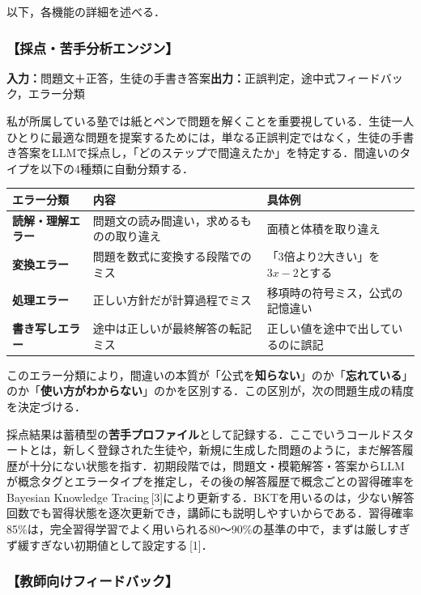 \documentclass[paper=a4,fontsize=10.5bp,jafontsize=10.5bp,twocolumn]{jlreq}
\begin{document}
以下，各機能の詳細を述べる．

\subsubsection{【採点・苦手分析エンジン】}

\noindent\textbf{入力：}問題文＋正答，生徒の手書き答案\quad\textbf{出力：}正誤判定，途中式フィードバック，エラー分類

私が所属している塾では紙とペンで問題を解くことを重要視している．生徒一人ひとりに最適な問題を提案するためには，単なる正誤判定ではなく，生徒の手書き答案をLLMで採点し，「どのステップで間違えたか」を特定する．間違いのタイプを以下の4種類に自動分類する．

\begin{scriptsize}\noindent
\begin{tabularx}{\linewidth}{>{\bfseries}l X X}
\toprule
エラー分類 & 内容 & 具体例 \\
\midrule
読解・理解エラー & 問題文の読み間違い，求めるものの取り違え & 面積と体積を取り違え \\
変換エラー & 問題を数式に変換する段階でのミス & 「3倍より2大きい」を$3x-2$とする \\
処理エラー & 正しい方針だが計算過程でミス & 移項時の符号ミス，公式の記憶違い \\
書き写しエラー & 途中は正しいが最終解答の転記ミス & 正しい値を途中で出しているのに誤記 \\
\bottomrule
\end{tabularx}
\end{scriptsize}

このエラー分類により，間違いの本質が「公式を\textbf{知らない}」のか「\textbf{忘れている}」のか「\textbf{使い方がわからない}」のかを区別する．この区別が，次の問題生成の精度を決定づける．

採点結果は蓄積型の\textbf{苦手プロファイル}として記録する．ここでいうコールドスタートとは，新しく登録された生徒や，新規に生成した問題のように，まだ解答履歴が十分にない状態を指す．初期段階では，問題文・模範解答・答案からLLMが概念タグとエラータイプを推定し，その後の解答履歴で概念ごとの習得確率をBayesian Knowledge Tracing\,[3]により更新する．BKTを用いるのは，少ない解答回数でも習得状態を逐次更新でき，講師にも説明しやすいからである．習得確率85\%は，完全習得学習でよく用いられる80〜90\%の基準の中で，まずは厳しすぎず緩すぎない初期値として設定する\,[1]．

\subsubsection{【教師向けフィードバック】}
\end{document}
